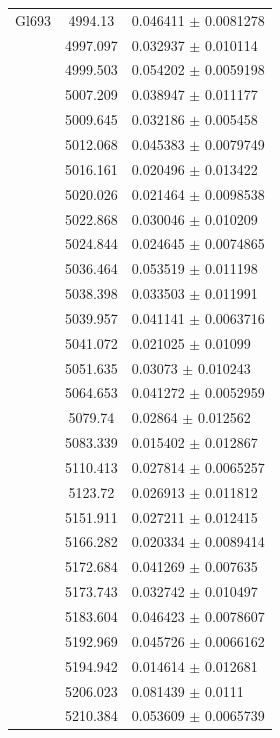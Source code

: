 \begin{longtable}{|c|c|l|}
\hline                                          
Gl693 & 4994.13 & 0.046411 $\pm$ 0.0081278 \\   
 & 4997.097 & 0.032937 $\pm$ 0.010114 \\        
 & 4999.503 & 0.054202 $\pm$ 0.0059198 \\       
 & 5007.209 & 0.038947 $\pm$ 0.011177 \\        
 & 5009.645 & 0.032186 $\pm$ 0.005458 \\        
 & 5012.068 & 0.045383 $\pm$ 0.0079749 \\       
 & 5016.161 & 0.020496 $\pm$ 0.013422 \\        
 & 5020.026 & 0.021464 $\pm$ 0.0098538 \\       
 & 5022.868 & 0.030046 $\pm$ 0.010209 \\        
 & 5024.844 & 0.024645 $\pm$ 0.0074865 \\       
 & 5036.464 & 0.053519 $\pm$ 0.011198 \\        
 & 5038.398 & 0.033503 $\pm$ 0.011991 \\        
 & 5039.957 & 0.041141 $\pm$ 0.0063716 \\       
 & 5041.072 & 0.021025 $\pm$ 0.01099 \\         
 & 5051.635 & 0.03073 $\pm$ 0.010243 \\         
 & 5064.653 & 0.041272 $\pm$ 0.0052959 \\       
 & 5079.74 & 0.02864 $\pm$ 0.012562 \\          
 & 5083.339 & 0.015402 $\pm$ 0.012867 \\        
 & 5110.413 & 0.027814 $\pm$ 0.0065257 \\       
 & 5123.72 & 0.026913 $\pm$ 0.011812 \\         
 & 5151.911 & 0.027211 $\pm$ 0.012415 \\        
 & 5166.282 & 0.020334 $\pm$ 0.0089414 \\       
 & 5172.684 & 0.041269 $\pm$ 0.007635 \\        
 & 5173.743 & 0.032742 $\pm$ 0.010497 \\        
 & 5183.604 & 0.046423 $\pm$ 0.0078607 \\       
 & 5192.969 & 0.045726 $\pm$ 0.0066162 \\       
 & 5194.942 & 0.014614 $\pm$ 0.012681 \\        
 & 5206.023 & 0.081439 $\pm$ 0.0111 \\          
 & 5210.384 & 0.053609 $\pm$ 0.0065739 \\       

\end{longtable}
